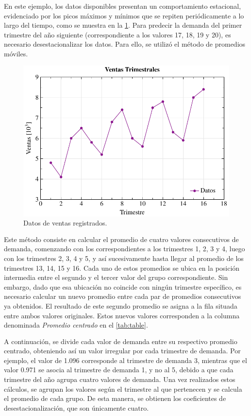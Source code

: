 En este ejemplo, los datos disponibles presentan un comportamiento estacional,
evidenciado por los picos máximos y mínimos que se repiten periódicamente a lo
largo del tiempo, como se muestra en la \cref{fig:season-data}.
Para predecir la demanda del primer trimestre del año siguiente
(correspondiente a los valores 17, 18, 19 y 20), es necesario
desestacionalizar los datos.
Para ello, se utilizó el método de promedios móviles.

\begin{figure}[htpb!]
  \centering
  \includegraphics[width=\columnwidth]{../Figures/season-data.pdf}
  \caption{Datos de ventas registrados.}
  \label{fig:season-data}
\end{figure}

Este método consiste en calcular el promedio de cuatro valores consecutivos de
demanda, comenzando con los correspondientes a los trimestres 1, 2, 3 y 4,
luego con los trimestres 2, 3, 4 y 5, y así sucesivamente hasta llegar al
promedio de los trimestres 13, 14, 15 y 16.
Cada uno de estos promedios se ubica en la posición intermedia entre el segundo
y el tercer valor del grupo correspondiente.
Sin embargo, dado que esa ubicación no coincide con ningún trimestre específico,
es necesario calcular un nuevo promedio entre cada par de promedios consecutivos
ya obtenidos.
El resultado de este segundo promedio se asigna a la fila situada entre ambos
valores originales.
Estos nuevos valores corresponden a la columna denominada \textit{Promedio centrado}
en el \cref{tab:table}.

A continuación, se divide cada valor de demanda entre su respectivo promedio
centrado, obteniendo así un valor irregular por cada trimestre de demanda.
Por ejemplo, el valor de 1.096 corresponde al trimestre de demanda 3, mientras
que el valor 0.971 se asocia al trimestre de demanda 1, y no al 5, debido a que
cada trimestre del año agrupa cuatro valores de demanda.
Una vez realizados estos cálculos, se agrupan los valores según el
trimestre al que pertenecen y se calcula el promedio de cada grupo.
De esta manera, se obtienen los coeficientes de desestacionalización, que son
únicamente cuatro.

